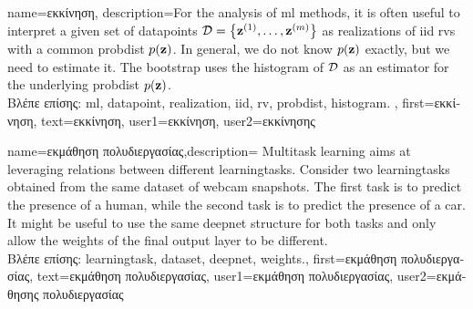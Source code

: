 {name={\foreignlanguage{greek}{εκκίνηση}},
	description={For the analysis of \gls{ml} methods, it is often useful to interpret 
		a given set of \gls{datapoint}s $\mathcal{D} = \big\{ {\bf z}^{(1)},\ldots,{\bf z}^{(m)}\big\}$ 
		as \gls{realization}s of \gls{iid} \gls{rv}s with a common \gls{probdist} $p({\bf z})$. In general, we 
		do not know $p({\bf z})$ exactly, but we need to estimate it. The bootstrap uses the 
		\gls{histogram} of $\mathcal{D}$ as an estimator for the underlying \gls{probdist} $p({\bf z})$.\\
		\foreignlanguage{greek}{Βλέπε επίσης:} \gls{ml}, \gls{datapoint}, \gls{realization}, \gls{iid}, \gls{rv}, \gls{probdist}, \gls{histogram}.
	},
	first={\foreignlanguage{greek}{εκκίνηση}},
	text={\foreignlanguage{greek}{εκκίνηση}},
	user1={\foreignlanguage{greek}{εκκίνηση}}, %
	user2={\foreignlanguage{greek}{εκκίνησης}} %
}

{name={\foreignlanguage{greek}{εκμάθηση πολυδιεργασίας}},description=
	{Multitask learning aims at leveraging relations between 
	 different \gls{learningtask}s. Consider two \gls{learningtask}s obtained from the 
	 same \gls{dataset} of webcam snapshots. The first task is to predict the presence 
	 of a human, while the second task is to predict the presence of a car. It might be useful 
	 to use the same \gls{deepnet} structure for both tasks and only allow the \gls{weights} of 
	 the final output layer to be different.\\
	 \foreignlanguage{greek}{Βλέπε επίσης:} \gls{learningtask}, \gls{dataset}, \gls{deepnet}, \gls{weights}.},
	first={\foreignlanguage{greek}{εκμάθηση πολυδιεργασίας}},
	text={\foreignlanguage{greek}{εκμάθηση πολυδιεργασίας}},
	user1={\foreignlanguage{greek}{εκμάθηση πολυδιεργασίας}}, %
	user2={\foreignlanguage{greek}{εκμάθησης πολυδιεργασίας}} %
}

